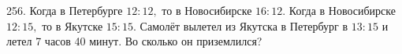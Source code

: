 256. Когда в Петербурге $12:12,$ то в Новосибирске $16:12.$ Когда в Новосибирске $12:15,$ то в Якутске $15:15.$ Самолёт вылетел из Якутска в Петербург в $13:15$ и летел 7 часов 40 минут. Во сколько он приземлился?\\
